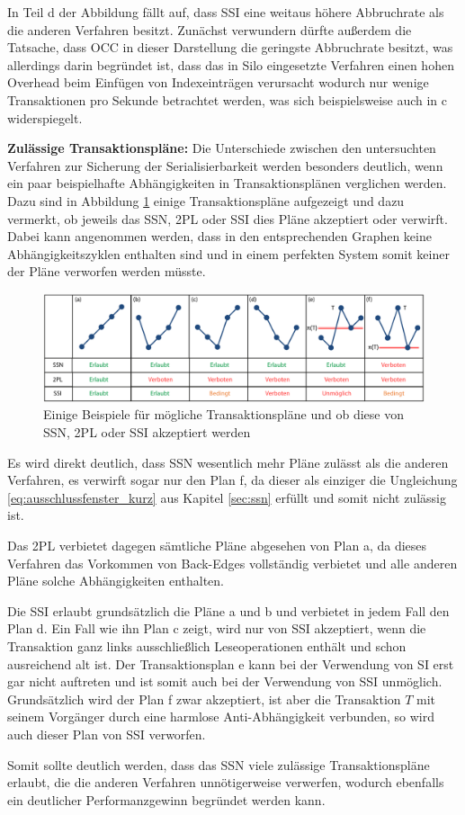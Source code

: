 In Teil d der Abbildung fällt auf, dass SSI eine weitaus höhere Abbruchrate als die anderen Verfahren besitzt.
Zunächst verwundern dürfte außerdem die Tatsache, dass OCC in dieser Darstellung die geringste Abbruchrate besitzt, was allerdings darin begründet ist, dass das in Silo eingesetzte Verfahren einen hohen Overhead beim Einfügen von Indexeinträgen verursacht wodurch nur wenige Transaktionen pro Sekunde betrachtet werden, was sich beispielsweise auch in c widerspiegelt.

\textbf{Zulässige Transaktionspläne:} Die Unterschiede zwischen den untersuchten Verfahren zur Sicherung der Serialisierbarkeit werden besonders deutlich, wenn ein paar beispielhafte Abhängigkeiten in Transaktionsplänen verglichen werden.
Dazu sind in Abbildung \ref{fig:transaktionsplan_formen} einige Transaktionspläne aufgezeigt und dazu vermerkt, ob jeweils das SSN, 2PL oder SSI dies Pläne akzeptiert oder verwirft.
Dabei kann angenommen werden, dass in den entsprechenden Graphen keine Abhängigkeitszyklen enthalten sind und in einem perfekten System somit keiner der Pläne verworfen werden müsste.

\begin{figure}
	\includegraphics[width=\textwidth]{img/Figure_6.pdf}
	\caption{Einige Beispiele für mögliche Transaktionspläne und ob diese von SSN, 2PL oder SSI akzeptiert werden}
	\label{fig:transaktionsplan_formen}
\end{figure}

Es wird direkt deutlich, dass SSN wesentlich mehr Pläne zulässt als die anderen Verfahren, es verwirft sogar nur den Plan f, da dieser als einziger die Ungleichung \ref{eq:ausschlussfenster_kurz} aus Kapitel \ref{sec:ssn} erfüllt und somit nicht zulässig ist.

Das 2PL verbietet dagegen sämtliche Pläne abgesehen von Plan a, da dieses Verfahren das Vorkommen von Back-Edges vollständig verbietet und alle anderen Pläne solche Abhängigkeiten enthalten.

Die SSI erlaubt grundsätzlich die Pläne a und b und verbietet in jedem Fall den Plan d.
Ein Fall wie ihn Plan c zeigt, wird nur von SSI akzeptiert, wenn die Transaktion ganz links ausschließlich Leseoperationen enthält und schon ausreichend alt ist.
Der Transaktionsplan e kann bei der Verwendung von SI erst gar nicht auftreten und ist somit auch bei der Verwendung von SSI unmöglich.
Grundsätzlich wird der Plan f zwar akzeptiert, ist aber die Transaktion $T$ mit seinem Vorgänger durch eine harmlose Anti-Abhängigkeit verbunden, so wird auch dieser Plan von SSI verworfen.

Somit sollte deutlich werden, dass das SSN viele zulässige Transaktionspläne erlaubt, die die anderen Verfahren unnötigerweise verwerfen, wodurch ebenfalls ein deutlicher Performanzgewinn begründet werden kann.